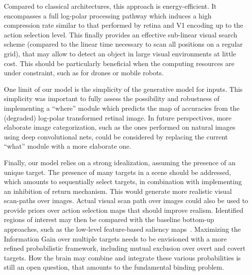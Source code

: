 Compared to classical architectures, this approach is energy-efficient. It encompasses a full log-polar processing pathway which induces a high compression rate similar to that performed by retina and V1 encoding up to the action selection level. This finally provides an effective sub-linear visual search scheme (compared to the linear time necessary to scan all positions on a regular grid), that may allow to detect an object in large visual environments at little cost. This should be particularly beneficial when the computing resources are under constraint, such as for drones or mobile robots. 

One limit of our model is the simplicity of the generative model for inputs. This simplicity was important to fully assess the possibility and robustness of implementing a ``where'' module which predicts the map of accuracies from the (degraded) log-polar transformed retinal image.
In future perspectives, more elaborate image categorization, such as the ones performed on natural images using deep convolutional nets, could be considered by replacing the current ``what'' module with a more elaborate one. 


Finally, our model relies on a strong idealization, assuming the presence of an unique target. The presence of many targets in a scene should be addressed, which amounts to sequentially select targets, in combination with implementing an inhibition of return mechanism. 
This would generate more realistic visual scan-paths over images. %
Actual visual scan path over images could also be used to provide priors over action selection maps that should improve realism.  %
Identified regions of interest may then be compared with the baseline bottom-up approaches, such as the low-level feature-based saliency maps~\citep{Itti01}. 
Maximizing the Information Gain over multiple targets needs to be envisioned with a more refined probabilistic framework, including mutual exclusion over overt and covert targets. How the brain may combine and integrate these various probabilities is still an open question, that amounts to the fundamental binding problem. %

